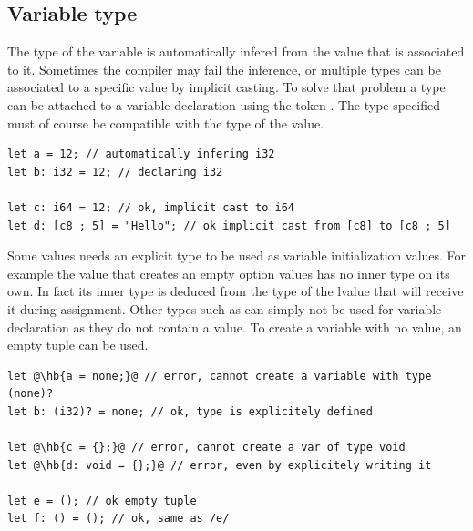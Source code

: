 \subsection{Variable type}
\label{sec:memory:variable_type}

The type of the variable is automatically infered from the value that is
associated to it. Sometimes the compiler may fail the inference, or multiple
types can be associated to a specific value by implicit casting. To solve that
problem a type can be attached to a variable declaration using the token
\token{:}. The type specified must of course be compatible with the type of the
value.

\begin{lstlisting}[style=coloredverbatim, escapechar=@]
let a = 12; // automatically infering i32
let b: i32 = 12; // declaring i32

let c: i64 = 12; // ok, implicit cast to i64
let d: [c8 ; 5] = "Hello"; // ok implicit cast from [c8] to [c8 ; 5]
\end{lstlisting}

Some values needs an explicit type to be used as variable initialization values.
For example the value  that creates an empty option values has no
inner type on its own. In fact its inner type is deduced from the type of the
lvalue that will receive it during assignment. Other types such as 
can simply not be used for variable declaration as they do not contain a value.
To create a variable with no value, an empty tuple \token{()} can be used.

\begin{lstlisting}[style=coloredverbatimError, escapechar=@]
let @\hb{a = none;}@ // error, cannot create a variable with type (none)?
let b: (i32)? = none; // ok, type is explicitely defined

let @\hb{c = {};}@ // error, cannot create a var of type void
let @\hb{d: void = {};}@ // error, even by explicitely writing it

let e = (); // ok empty tuple
let f: () = (); // ok, same as /e/
\end{lstlisting}


\vfill%
\pagebreak
